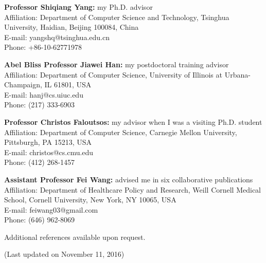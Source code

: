 \documentclass[margin, 10pt]{res}
\begin{document}
\begin{resume}
\textbf{Professor Shiqiang Yang:} my Ph.D. advisor \\
{Affiliation}: {Department of Computer Science and Technology, Tsinghua University, Haidian, Beijing 100084, China} \\
{E-mail:} {yangshq@tsinghua.edu.cn} \\
{Phone:} {+86-10-62771978}

\textbf{Abel Bliss Professor Jiawei Han:} my postdoctoral training advisor \\
{Affiliation}: {Department of Computer Science, University of Illinois at Urbana-Champaign, IL 61801, USA} \\
{E-mail:} {hanj@cs.uiuc.edu} \\
{Phone:} {(217) 333-6903}

\textbf{Professor Christos Faloutsos:} my advisor when I was a visiting Ph.D. student \\
{Affiliation}: {Department of Computer Science, Carnegie Mellon University, Pittsburgh, PA 15213, USA} \\
{E-mail:} {christos@cs.cmu.edu} \\
{Phone:} {(412) 268-1457}

\textbf{Assistant Professor Fei Wang:} advised me in six collaborative publications \\
{Affiliation}: {Department of Healthcare Policy and Research, Weill Cornell Medical School, Cornell University, New York, NY 10065, USA} \\
{E-mail:} {feiwang03@gmail.com} \\
{Phone:} {(646) 962-8069}

Additional references available upon request.

(Last updated on November 11, 2016)
\end{resume}
\end{document}
